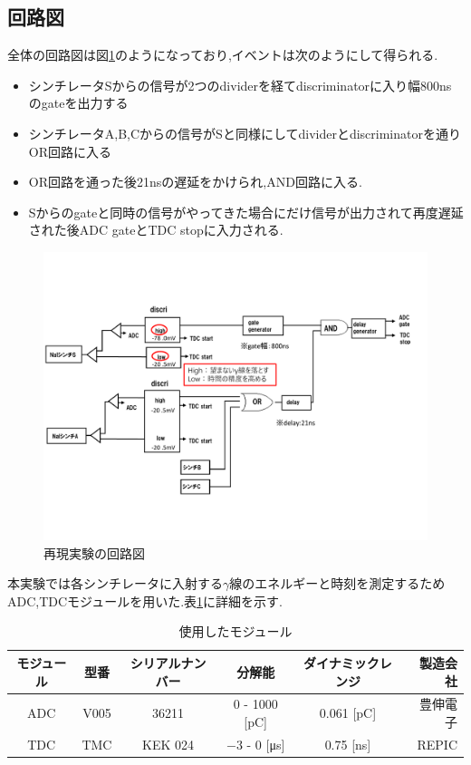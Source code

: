 \subsection{回路図}
全体の回路図は図\ref{fig:circuit2015}のようになっており,イベントは次のようにして得られる.
\begin{itemize}
		\item シンチレータSからの信号が2つのdividerを経てdiscriminatorに入り幅800nsのgateを出力する
		\item シンチレータA,B,Cからの信号がSと同様にしてdividerとdiscriminatorを通りOR回路に入る
		\item OR回路を通った後21nsの遅延をかけられ,AND回路に入る.
		\item Sからのgateと同時の信号がやってきた場合にだけ信号が出力されて再度遅延された後ADC gateとTDC stopに入力される.
\end{itemize}
\begin{figure}[htbp]
	\centering
		\includegraphics[width=15cm]{fig/isb/circuit.pdf}
		\caption{再現実験の回路図~\cite{卒業発表2015}}
		\label{fig:circuit2015}
\end{figure}

本実験では各シンチレータに入射する$\gamma$線のエネルギーと時刻を測定するためADC,TDCモジュールを用いた.表\ref{module2016}に詳細を示す.
\begin{table}[H]
	\centering
	\begin{tabular}{|c|c|c|c|c|r|} \hline
		モジュール & 型番 & シリアルナンバー & 分解能 & ダイナミックレンジ & 製造会社 \\ \hline \hline
		ADC & V005 & 36211 & 0 - 1000 [\si{\pico\coulomb}] & 0.061 [\si{\pico\coulomb}] & 豊伸電子 \\ \hline
		TDC & TMC & KEK 024 & $-3$ - 0 [\si{\micro\second}] & 0.75 [\si{\nano\second}] & REPIC \\ \hline
	\end{tabular}
	\caption{使用したモジュール}
	\label{module2016}
\end{table}

